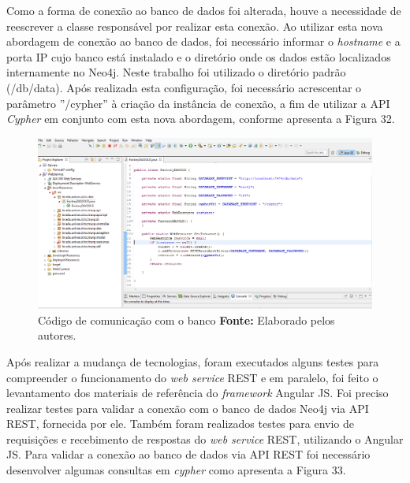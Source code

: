 \par Como a forma de conexão ao banco de dados foi alterada, houve a necessidade de reescrever a classe responsável por realizar esta conexão. Ao utilizar esta nova abordagem de conexão ao banco de dados, foi necessário informar o \textit{hostname} e a porta IP cujo banco está instalado e o diretório onde os dados estão localizados internamente no Neo4j. Neste trabalho foi utilizado o diretório padrão (/db/data). Após realizada esta configuração, foi necessário acrescentar o parâmetro ''/cypher'' à criação da instância de conexão, a fim de utilizar a API \textit{Cypher} em conjunto com esta nova abordagem, conforme apresenta a Figura 32.

\begin{figure}[h!]
	\centerline{\includegraphics[scale=0.35]{./imagens/conexao-banco.jpg}}
	\caption[Código de comunicação com o banco]
	{Código de comunicação com o banco \textbf{Fonte:} Elaborado pelos autores.}
	\label{fig:exemplo1}
\end{figure}

\par Após realizar a mudança de tecnologias, foram executados alguns testes para compreender o funcionamento do \textit{web service} REST e em paralelo, foi feito o levantamento dos materiais de referência do \textit{framework} Angular JS. Foi preciso realizar testes para validar a conexão com o banco de dados Neo4j via API REST, fornecida por ele. Também foram realizados testes para envio de requisições e recebimento de respostas do \textit{web service} REST, utilizando o Angular JS. Para validar a conexão ao banco de dados via API REST foi necessário desenvolver algumas consultas em \textit{cypher} como apresenta a Figura 33.

